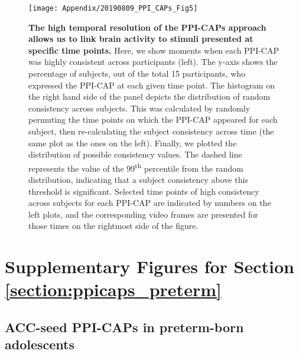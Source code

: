\begin{figure}[h]
\centering
\texttt{[image: Appendix/20190809\_PPI\_CAPs\_Fig5]}
\caption{\textbf{The high temporal resolution of the PPI-CAPs approach allows us to link brain activity to stimuli presented at specific time points.} Here, we show moments when each PPI-CAP was highly consistent across participants (left). The y-axis shows the percentage of subjects, out of the total 15 participants, who expressed the PPI-CAP at each given time point.  The histogram on the right hand side of the panel depicts the distribution of random consistency across subjects. This was calculated by randomly permuting the time points on which the PPI-CAP appeared for each subject, then re-calculating the subject consistency across time (the same plot as the ones on the left). Finally, we plotted the distribution of possible consistency values. The dashed line represents the value of the 99\textsuperscript{th} percentile from the random distribution, indicating that a subject consistency above this threshold is significant. Selected time points of high consistency across subjects for each PPI-CAP are indicated by numbers on the left plots, and the corresponding video frames are presented for those times on the rightmost side of the figure.   }
\label{fig:PPI_CAPs_Fig5}
\end{figure}


\clearpage
\section{Supplementary Figures for Section \ref{section:ppicaps_preterm}}

\subsection*{ACC-seed PPI-CAPs in preterm-born adolescents}


